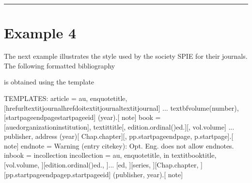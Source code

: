 \documentclass[letterpaper,10pt,english]{sphinxmanual}
\begin{document}
\bigskip\hrule\bigskip



\section{Example 4}
\label{\detokenize{examples:example-4}}
The next example illustrates the style used by the society SPIE for their journals. The following formatted bibliography

\noindent{}

is obtained using the template

%
\begin{sphinxVerbatim}[commandchars=\\\{\}]
TEMPLATES:
article = \PYGZlt{}au\PYGZgt{}, \PYGZbs{}enquote\PYGZob{}\PYGZlt{}title\PYGZgt{},\PYGZcb{} [\PYGZbs{}href\PYGZob{}\PYGZlt{}url\PYGZgt{}\PYGZcb{}\PYGZob{}\PYGZbs{}textit\PYGZob{}\PYGZlt{}journal\PYGZgt{}\PYGZcb{}\PYGZcb{}\textbar{}\PYGZbs{}href\PYGZob{}\PYGZlt{}doi\PYGZgt{}\PYGZcb{}\PYGZob{}\PYGZbs{}textit\PYGZob{}\PYGZlt{}journal\PYGZgt{}\PYGZcb{}\PYGZcb{}\textbar{}\PYGZbs{}textit\PYGZob{}\PYGZlt{}journal\PYGZgt{}\PYGZcb{}]\PYGZob{} \PYGZcb{}...
        \PYGZbs{}textbf\PYGZob{}\PYGZlt{}volume\PYGZgt{}\PYGZcb{}(\PYGZlt{}number\PYGZgt{}), [\PYGZlt{}startpage\PYGZgt{}\PYGZhy{}\PYGZhy{}\PYGZlt{}endpage\PYGZgt{}\textbar{}\PYGZlt{}startpage\PYGZgt{}\textbar{}\PYGZlt{}eid\PYGZgt{}\textbar{}] (\PYGZlt{}year\PYGZgt{}).[ \PYGZlt{}note\PYGZgt{}]
book = [\PYGZlt{}au\PYGZgt{}\textbar{}\PYGZlt{}ed\PYGZgt{}\textbar{}\PYGZlt{}organization\PYGZgt{}\textbar{}\PYGZlt{}institution\PYGZgt{}\textbar{}], \PYGZbs{}textit\PYGZob{}\PYGZlt{}title\PYGZgt{}\PYGZcb{}[, \PYGZlt{}edition.ordinal()\PYGZgt{}\PYGZti{}ed.][, vol.\PYGZti{}\PYGZlt{}volume\PYGZgt{}]\PYGZob{} \PYGZcb{}...
        \PYGZlt{}publisher\PYGZgt{}, \PYGZlt{}address\PYGZgt{} (\PYGZlt{}year\PYGZgt{})[ Chap.\PYGZti{}\PYGZlt{}chapter\PYGZgt{}][, pp.\PYGZti{}\PYGZlt{}startpage\PYGZgt{}\PYGZhy{}\PYGZhy{}\PYGZlt{}endpage\PYGZgt{}\textbar{}, p.\PYGZti{}\PYGZlt{}startpage\PYGZgt{}].[ \PYGZlt{}note\PYGZgt{}]
endnote = Warning (entry \PYGZlt{}citekey\PYGZgt{}): Opt.\PYGZbs{} Eng.\PYGZbs{} does not allow endnotes.
inbook = incollection
incollection = \PYGZlt{}au\PYGZgt{}, \PYGZbs{}enquote\PYGZob{}\PYGZlt{}title\PYGZgt{},\PYGZcb{} in \PYGZbs{}textit\PYGZob{}\PYGZlt{}booktitle\PYGZgt{}\PYGZcb{}, [vol.\PYGZti{}\PYGZlt{}volume\PYGZgt{}, ][\PYGZlt{}edition.ordinal()\PYGZgt{}\PYGZti{}ed., ]...
        [\PYGZlt{}ed\PYGZgt{}, ][\PYGZlt{}series\PYGZgt{}, ][Chap.\PYGZti{}\PYGZlt{}chapter\PYGZgt{}, ][pp.\PYGZti{}\PYGZlt{}startpage\PYGZgt{}\PYGZhy{}\PYGZhy{}\PYGZlt{}endpage\PYGZgt{}\textbar{}p.\PYGZti{}\PYGZlt{}startpage\PYGZgt{}\textbar{}\PYGZlt{}eid\PYGZgt{}\textbar{}] (\PYGZlt{}publisher\PYGZgt{}, \PYGZlt{}year\PYGZgt{}).[ \PYGZlt{}note\PYGZgt{}]

\end{sphinxVerbatim}
\end{document}
